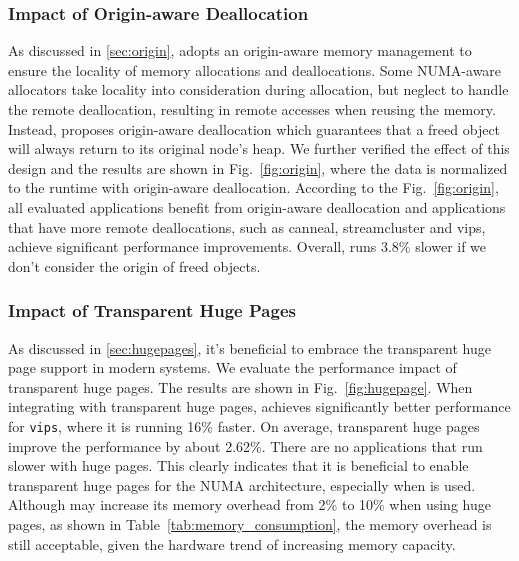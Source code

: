
\subsubsection{Impact of Origin-aware Deallocation}

As discussed in \ref{sec:origin}, \NM{} adopts an origin-aware memory management to ensure the locality of memory allocations and deallocations. Some NUMA-aware allocators take locality into consideration during allocation, but neglect to handle the remote deallocation, resulting in remote accesses when reusing the memory. Instead, \NM{} proposes origin-aware deallocation which guarantees that a freed object will always return to its original node's heap. We further verified the effect of this design and the results are shown in Fig.~\ref{fig:origin}, where the data is normalized to the runtime with origin-aware deallocation. According to the Fig.~\ref{fig:origin}, all evaluated applications benefit from origin-aware deallocation and applications that have more remote deallocations, such as canneal, streamcluster and vips, achieve significant performance improvements. Overall, \NM{} runs 3.8\% slower if we don't consider the origin of freed objects.


\subsubsection{Impact of Transparent Huge Pages}

As discussed in \ref{sec:hugepages}, it's beneficial to embrace the transparent huge page support in modern systems. We evaluate the performance impact of transparent huge pages. The results are shown in Fig.~\ref{fig:hugepage}. When integrating with transparent huge pages, \NM{} achieves significantly better performance for \texttt{vips}, where it is running 16\% faster. On average, transparent huge pages improve the performance by about 2.62\%. There are no applications that run slower with huge pages. This clearly indicates that it is beneficial to enable transparent huge pages for the NUMA architecture, especially when \NM{} is used. 
Although \NM{} may increase its memory overhead from 2\% to 10\% when using huge pages, as shown in Table~\ref{tab:memory_consumption}, the memory overhead is still acceptable, given the hardware trend of increasing memory capacity.  


